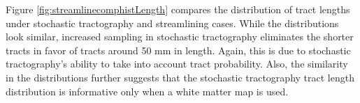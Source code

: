 Figure \ref{fig:streamlinecomphistLength} compares the distribution of tract lengths under stochastic tractography and streamlining cases.  While the distributions look similar, increased sampling in stochastic tractography eliminates the shorter tracts in favor of tracts around 50 mm in length.  Again, this is due to stochastic tractography's ability to take into account tract probability.  Also, the similarity in the distributions further suggests that the stochastic tractography tract length distribution is informative only when a white matter map is used.




